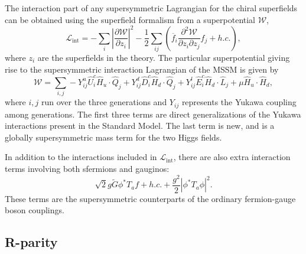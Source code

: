 The interaction part of any supersymmetric Lagrangian for the chiral superfields can be obtained
using the superfield formalism from a superpotential $\mathcal{W}$,
\begin{equation}
  \mathcal{L}_{\text{int}} = - \sum_i \left|\frac{\partial \mathcal{W}}{\partial z_i}\right|^2 -
\frac{1}{2} \sum_{ij} \left( \overline{f}_{i}\frac{\partial^
2 \mathcal{W}}{\partial z_i \partial z_j}f_j + h.c. \right) ,
  \label{eq:L_int}
\end{equation}
where $z_i$ are the superfields in the theory. 
The particular superpotential giving rise to the supersymmetric interaction Lagrangian of the MSSM
is given by
\begin{equation}
  \mathcal{W} = \sum_{i,j} - Y_{ij}^u \widehat{U}_i^c \widehat{H}_u \cdot \widehat{Q}_j + Y_{ij}^d
\widehat{D}_i^c \widehat{H}_d \cdot \widehat{Q}_j +
 Y_{ij}^l \widehat{E}_i^c \widehat{H}_d \cdot \widehat{L}_j + \mu \widehat{H}_u \cdot \widehat{H}_d
,
  \label{eq:superpotential}
\end{equation}
where $i,j$ run over the three generations and $Y_{ij}$ represents the Yukawa coupling among
generations. The first three terms are direct generalizations of the Yukawa interactions present in
the Standard Model. The last term is new, and is a globally supersymmetric mass term for the
two Higgs fields. 

In addition to the interactions included in $\mathcal{L}_{\text{int}}$, there are also extra
interaction terms involving both sfermions and gauginos:
\begin{equation}
  \sqrt{2}g\widetilde{G}\phi^*T_af + h.c. + \frac{g^2}{2} \left| \phi^* T_a\phi\right|^2 .
  \label{eq:L_extra}
\end{equation}
These terms are the supersymmetric counterparts of the ordinary fermion-gauge boson couplings. 



\subsection{R-parity \label{sec:susy_rparity}}

